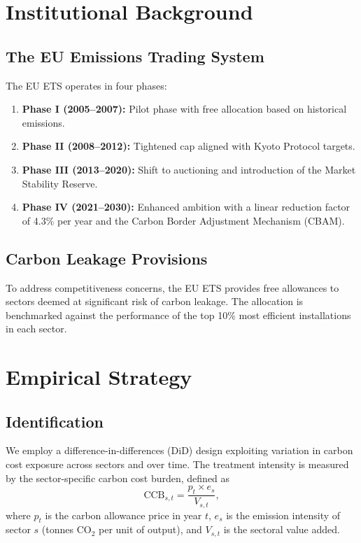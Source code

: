 \documentclass[
    language=english,
    doctype=article,
    institution=none,
    titlestyle=book,
]{../../omnilatex}
\begin{document}
\section{Institutional Background}

\subsection{The EU Emissions Trading System}
The EU ETS operates in four phases:
\begin{enumerate}
    \item \textbf{Phase I (2005--2007):} Pilot phase with free allocation
    based on historical emissions.
    \item \textbf{Phase II (2008--2012):} Tightened cap aligned with Kyoto
    Protocol targets.
    \item \textbf{Phase III (2013--2020):} Shift to auctioning and
    introduction of the Market Stability Reserve.
    \item \textbf{Phase IV (2021--2030):} Enhanced ambition with a linear
    reduction factor of 4.3\% per year and the Carbon Border Adjustment
    Mechanism (CBAM).
\end{enumerate}

\subsection{Carbon Leakage Provisions}
To address competitiveness concerns, the EU ETS provides free allowances to
sectors deemed at significant risk of carbon leakage.  The allocation is
benchmarked against the performance of the top 10\% most efficient installations
in each sector.

\section{Empirical Strategy}

\subsection{Identification}
We employ a difference-in-differences (DiD) design exploiting variation in
carbon cost exposure across sectors and over time.  The treatment intensity
is measured by the sector-specific carbon cost burden, defined as
\begin{equation}
    \text{CCB}_{s,t} = \frac{p_t \times e_s}{V_{s,t}},
    \label{eq:ccb}
\end{equation}
where $p_t$ is the carbon allowance price in year $t$, $e_s$ is the
emission intensity of sector $s$ (tonnes CO$_2$ per unit of output), and
$V_{s,t}$ is the sectoral value added.
\end{document}
